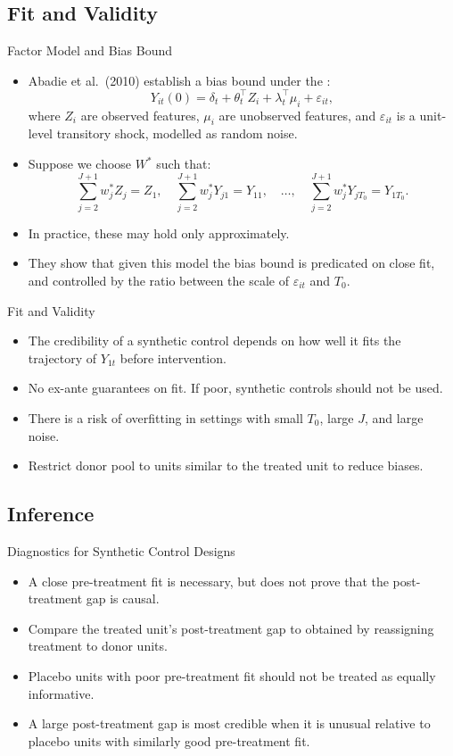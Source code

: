 \documentclass[11pt,aspectratio=169]{beamer}
\begin{document}
\subsection{Fit and Validity}

\begin{frame}{Factor Model and Bias Bound}
\begin{itemize}
  \item Abadie et al.\ (2010) establish a bias bound under the :
  \[Y_{it}(0)=\delta_t+\theta_t^\top Z_i+\lambda_t^\top\mu_i+\varepsilon_{it},\]
  where $Z_i$ are observed features, $\mu_i$ are unobserved features, and $\varepsilon_{it}$ is a unit-level transitory shock, modelled as random noise.
  \item Suppose we choose $W^*$ such that:
  \[\sum_{j=2}^{J+1}w_j^*Z_j=Z_1,\quad\sum_{j=2}^{J+1}w_j^*Y_{j1}=Y_{11},\quad\dots,\quad\sum_{j=2}^{J+1}w_j^*Y_{jT_0}=Y_{1T_0}.\]
  \item In practice, these may hold only approximately.
  \item They show that given this model the bias bound is predicated on close fit, and controlled by the ratio between the scale of $\varepsilon_{it}$ and $T_0$.
\end{itemize}
\end{frame}

\begin{frame}{Fit and Validity}
\begin{itemize}
  \item The credibility of a synthetic control depends on how well it fits the trajectory of $Y_{1t}$ before intervention.
  \item No ex-ante guarantees on fit. If poor, synthetic controls should not be used.
  \item There is a risk of overfitting in settings with small $T_0$, large $J$, and large noise.
  \item Restrict donor pool to units similar to the treated unit to reduce biases.
\end{itemize}
\end{frame}


\subsection{Inference}

\begin{frame}{Diagnostics for Synthetic Control Designs}
\begin{itemize}
  \item A close pre-treatment fit is necessary, but does not prove that the post-treatment gap is causal.
  \item Compare the treated unit's post-treatment gap to  obtained by reassigning treatment to donor units.
  \item Placebo units with poor pre-treatment fit should not be treated as equally informative.
  \item A large post-treatment gap is most credible when it is unusual relative to placebo units with similarly good pre-treatment fit.
\end{itemize}
\end{frame}
\end{document}
